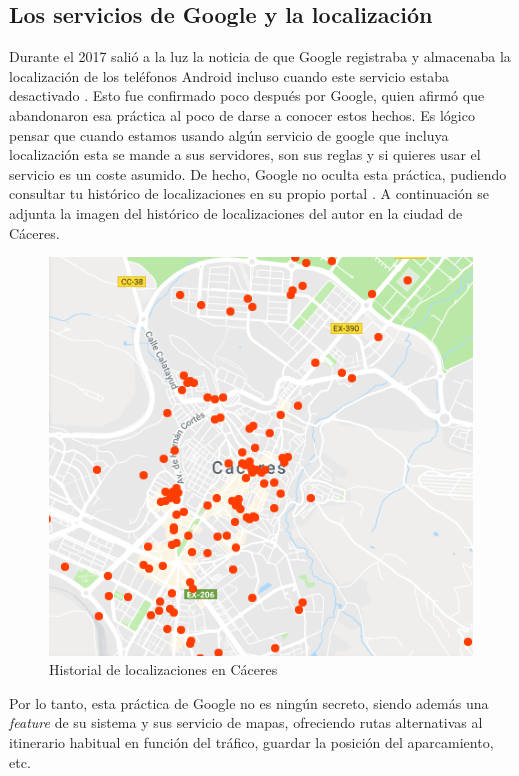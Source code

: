 \documentclass[12pt,a4paper,oneside]{book} %
\begin{document}
\subsection{Los servicios de Google y la localización}
Durante el 2017 salió a la luz la noticia de que Google registraba y almacenaba la localización de los teléfonos Android incluso cuando este servicio estaba desactivado \cite{googleLocalizacion}. Esto fue confirmado poco después por Google, quien afirmó que abandonaron esa práctica al poco de darse a conocer estos hechos. 
\newline \newline 
Es lógico pensar que cuando estamos usando algún servicio de google que incluya localización esta se mande a sus servidores, son sus reglas y si quieres usar el servicio es un coste asumido. De hecho, Google no oculta esta práctica, pudiendo consultar tu histórico de localizaciones en su propio portal \cite{googleLocationHistory}. A continuación se adjunta la imagen del histórico de localizaciones del autor en la ciudad de Cáceres. 
\begin{figure}[H]
\begin{center}
	\includegraphics[scale=0.5]{pictures/data/google_location_history.png}
	\caption{Historial de localizaciones en Cáceres}
	\label{fig:Historico de localizaciones}
\end{center}
\end{figure}
Por lo tanto, esta práctica de Google no es ningún secreto, siendo además una \textit{feature} de su sistema y sus servicio de mapas, ofreciendo rutas alternativas al itinerario habitual en función del tráfico, guardar la posición del aparcamiento, etc. 
\end{document}
